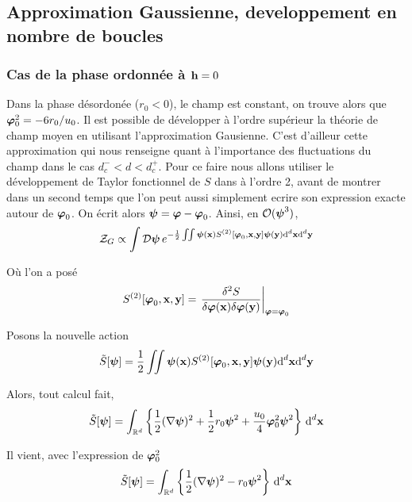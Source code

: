 \documentclass[10pt]{article}
\begin{document}
\begin{multicols}{2}
\vspace*{11pt}

\subsection{Approximation Gaussienne, developpement en nombre de boucles}

\subsubsection{Cas de la phase ordonnée à ${\bf h}=0$}

Dans la phase désordonée ($r_0 < 0$), le champ est constant, on trouve alors que $\boldsymbol{ \varphi}_0^2 = -6r_0/u_0$. Il est possible de développer à l'ordre supérieur la théorie de champ moyen en utilisant l'approximation Gausienne. C'est d'ailleur cette approximation qui nous renseigne quant à l'importance des fluctuations du champ dans le cas $d_c^- < d < d_c^+$. Pour ce faire nous allons utiliser le développement de Taylor fonctionnel de $S$ dans à l'ordre 2, avant de montrer dans un second temps que l'on peut aussi simplement ecrire son expression exacte autour de $\boldsymbol{ \varphi}_0$. On écrit alors $\boldsymbol{ \psi} = \boldsymbol{ \varphi} -\boldsymbol{ \varphi}_0$. Ainsi, en $\mathcal{O}(\boldsymbol{ \psi}^3)$, 
\begin{equation}
  \mathcal{Z}_G  \propto \int \mathcal{D} \boldsymbol{ \psi} \, e^{- \frac{1}{2}\iint \boldsymbol{ \psi}({\bf x}) S^{(2)}[\boldsymbol{ \varphi}_0, {\bf x}, {\bf y}] \boldsymbol{ \psi}({\bf y}) \text{d}^d {\bf x} \text{d}^d {\bf y}}
\end{equation}

Où l'on a posé
\begin{equation}
S^{(2)}[\boldsymbol{ \varphi}_0, {\bf x}, {\bf y}] = {\left. \frac{\delta ^2 S}{\delta \boldsymbol{ \varphi}({\bf x})\delta\boldsymbol{ \varphi}({\bf y})} \right|}_{\boldsymbol{ \varphi} = \boldsymbol{ \varphi}_0 }
\end{equation}

Posons la nouvelle action
\begin{equation}
 \tilde{S}[\boldsymbol{ \psi}] = \frac{1}{2} \iint \boldsymbol{ \psi}({\bf x}) S^{(2)}[\boldsymbol{ \varphi}_0, {\bf x}, {\bf y}] \boldsymbol{ \psi}({\bf y}) \text{d}^d {\bf x} \text{d}^d {\bf y}
\end{equation}

Alors, tout calcul fait, 
\begin{equation}
\begin{split}
  \tilde{S}[\boldsymbol{ \psi}] = \int_{\mathbb{R}^d} \left\{ \frac{1}{2} (\nabla \boldsymbol{ \psi})^2 + \frac{1}{2} r_0 \boldsymbol{ \psi}^2 + \frac{u_0}{4}\boldsymbol{ \varphi}_0^2\boldsymbol{ \psi}^2 \right\} \, \text{d}^d {\bf x}
\end{split}
\end{equation}

Il vient, avec l'expression de $\boldsymbol{ \varphi}_0^2$
\begin{equation}
  \tilde{S}[\boldsymbol{ \psi}] = \int_{\mathbb{R}^d} \left\{ \frac{1}{2} (\nabla \boldsymbol{ \psi})^2 - r_0 \boldsymbol{ \psi}^2 \right\} \, \text{d}^d {\bf x}
\end{equation}


\end{multicols}
\end{document}
